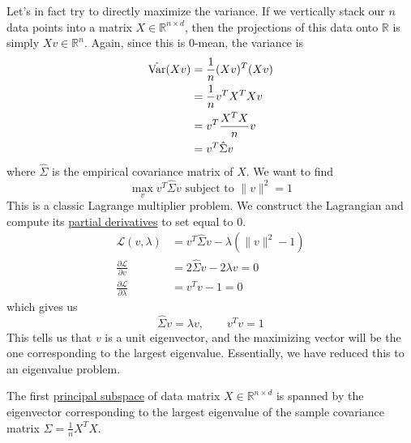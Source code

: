   Let's in fact try to directly maximize the variance. If we vertically stack our $n$ data points into a matrix $X \in \mathbb{R}^{n \times d}$, then the projections of this data onto $\mathbb{R}$ is simply $X v \in \mathbb{R}^n$. Again, since this is $0$-mean, the variance is 
  \begin{align}
    \label{eq:var_decom}
    \hat{\operatorname{Var}}(Xv) 
    & = \frac{1}{n} (Xv)^T (Xv) \\ 
    & = \frac{1}{n} v^T X^T X v \\
    & = v^T \frac{X^T X}{n} v \\ 
    & = v^T \hat{\Sigma} v
  \end{align}
  where $\hat{\Sigma}$ is the empirical covariance matrix of $X$. We want to find 
  \begin{equation}
    \max_{v} v^T \hat{\Sigma} v \text{ subject to } \|v\|^2 = 1
  \end{equation} 
  This is a classic Lagrange multiplier problem. We construct the Lagrangian and compute its \hyperref[mv-def:partial-derivative]{partial derivatives} to set equal to $0$. 
  \begin{align}
    \mathcal{L}(v, \lambda) & = v^T \hat{\Sigma} v - \lambda (\|v\|^2 - 1) \\  
    \frac{\partial \mathcal{L}}{\partial v} & = 2 \hat{\Sigma} v - 2 \lambda v = 0 \\ 
    \frac{\partial \mathcal{L}}{\partial \lambda} & = v^T v - 1 = 0
  \end{align} 
  which gives us 
  \begin{equation}
    \hat{\Sigma} v = \lambda v, \qquad v^T v = 1
  \end{equation} 
  This tells us that $v$ is a unit eigenvector, and the maximizing vector will be the one corresponding to the largest eigenvalue. Essentially, we have reduced this to an eigenvalue problem. 
  
  \begin{theorem}
    \label{thm:1st-principal-subspace-as-eigenvector}
    The first \hyperref[def:principal-subspace]{principal subspace} of data matrix $X \in \mathbb{R}^{n \times d}$ is spanned by the eigenvector corresponding to the largest eigenvalue of the sample covariance matrix $\hat{\Sigma} = \frac{1}{n} X^T X$. 
  \end{theorem}

